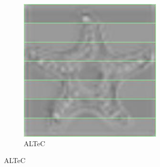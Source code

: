 \documentclass[aspectratio=169]{beamer}
\begin{document}
\begin{frame}
\begin{figure}[H]
        \hfill	
		\begin{subfigure}{.17\textwidth}
			\centering
			\includegraphics[width=0.778\textwidth]{altecrepairedchannel1scaled.jpg}
			\caption{ALTeC}
		\end{subfigure}
		

\end{figure}
\end{frame}
\end{document}
